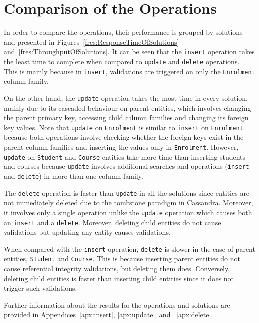 \section{Comparison of the Operations} \label{s:comparisonOfOperations}

In order to compare the operations, their performance  is grouped by solutions
and presented in Figures~\ref{fres:ResponseTimeOfSolutions}
and~\ref{fres:ThroughputOfSolutions}. It can be seen that the \texttt{insert}
operation takes the least time to complete when compared to \texttt{update} and
\texttt{delete} operations.  This is mainly because in \texttt{insert}, 
validations are triggered on only the \texttt{Enrolment} column family.

On the other hand,  the \texttt{update} operation takes the most time  in every
solution,  mainly due to its cascaded behaviour on parent entities,  which
involves changing the parent primary key,  accessing child column families and
changing its foreign key values.
Note that \texttt{update} on \texttt{Enrolment} is similar to \texttt{insert} on
\texttt{Enrolment} because both operations involve checking whether the foreign
keys exist in the parent column families and inserting the values only in
\texttt{Enrolment}.
However,  \texttt{update} on \texttt{Student} and  \texttt{Course} entities take
more time than inserting students and courses because \texttt{update} involves
additional searches and operations (\texttt{insert} and \texttt{delete})
in more than one column family. 

The \texttt{delete} operation is faster than \texttt{update} in all the
solutions since entities are not immediately deleted due to the tombstone
paradigm in Cassandra.  Moreover, it involves only a single operation
unlike the \texttt{update} operation which causes both an \texttt{insert} and a
 \texttt{delete}.  Moreover, deleting child entities do not cause validations
 but updating any entity causes validations.

When compared with the \texttt{insert} operation,  \texttt{delete} is slower in
the case of parent entities,  \texttt{Student} and \texttt{Course}.  This is
because inserting parent entities do not cause referential integrity
validations,  but deleting them does.  Conversely,  deleting child entities is
faster than inserting child entities since it does not trigger such validations.

Further information about the results for the operations and solutions are
provided in Appendices~\ref{apx:insert}, \ref{apx:update}, and
~\ref{apx:delete}.

